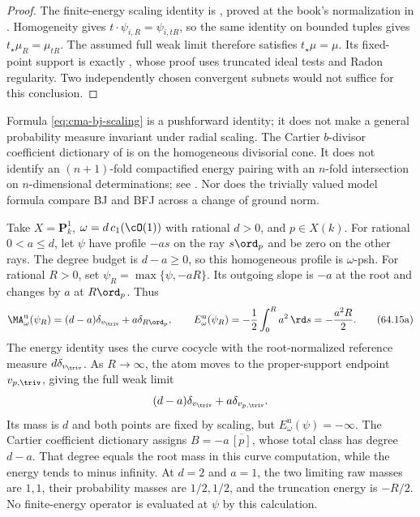 \begin{proof}
The finite-energy scaling identity is
\cite[Proposition~7.19(iii)]{BJ22}, proved at the book's normalization in
. Homogeneity gives
$t\cdot\psi_{i,R}=\psi_{i,tR}$, so the same identity on bounded tuples
gives $t_\star\mu_R=\mu_{tR}$. The assumed full weak limit therefore
satisfies $t_\star\mu=\mu$. Its fixed-point support is exactly
, whose proof uses truncated ideal
tests and Radon regularity. Two independently chosen convergent subnets
would not suffice for this conclusion.
\end{proof}

Formula \eqref{eq:cma-bj-scaling} is a pushforward identity; it does not
make a general probability measure invariant under radial scaling.
The Cartier $b$-divisor coefficient dictionary of
 is on the homogeneous divisorial cone.
It does not identify an $(n+1)$-fold compactified energy pairing with an
$n$-fold intersection on $n$-dimensional determinations; see
. Nor does the trivially valued
model formula compare BJ and BFJ across a change of ground norm.

\begin{example}
\label{ex:cma-homogeneous-degree-d}
Take $X=\mathbf P^1_k$, $\omega=d\,c_1(\cO(1))$ with rational $d>0$,
and $p\in X(k)$. For rational $0<a\leq d$, let $\psi$ have profile
$-as$ on the ray $s\ord_p$ and be zero on the other rays. The degree
budget is $d-a\geq0$, so this homogeneous profile is $\omega$-psh.
For rational $R>0$, set $\psi_R=\max\{\psi,-aR\}$. Its outgoing
slope is $-a$ at the root and changes by $a$ at $R\ord_p$. Thus
\[
 \MA^{\mathrm u}_\omega(\psi_R)
       =(d-a)\delta_{v_{\triv}}+a\delta_{R\ord_p},\qquad
 E^{\mathrm u}_\omega(\psi_R)
       =-\frac12\int_0^R a^2\,\rd s=-\frac{a^2R}{2}.
 \tag{64.15a}\label{eq:cma-homogeneous-truncation-test}
\]
The energy identity uses the curve cocycle with the root-normalized
reference measure $d\delta_{v_{\triv}}$. As $R\to\infty$, the atom
moves to the proper-support endpoint $v_{p,\triv}$, giving the full
weak limit
\[
            (d-a)\delta_{v_{\triv}}+a\delta_{v_{p,\triv}}.
\]
Its mass is $d$ and both points are fixed by scaling, but
$E^{\mathrm u}_\omega(\psi)=-\infty$. The Cartier coefficient dictionary
assigns $B=-a\,\overline{[p]}$, whose total class has degree $d-a$.
That degree equals the root mass in this curve computation, while the
energy tends to minus infinity. At $d=2$ and $a=1$, the two limiting
raw masses are $1,1$, their probability masses are $1/2,1/2$, and the
truncation energy is $-R/2$. No finite-energy operator is evaluated at
$\psi$ by this calculation.
\end{example}

